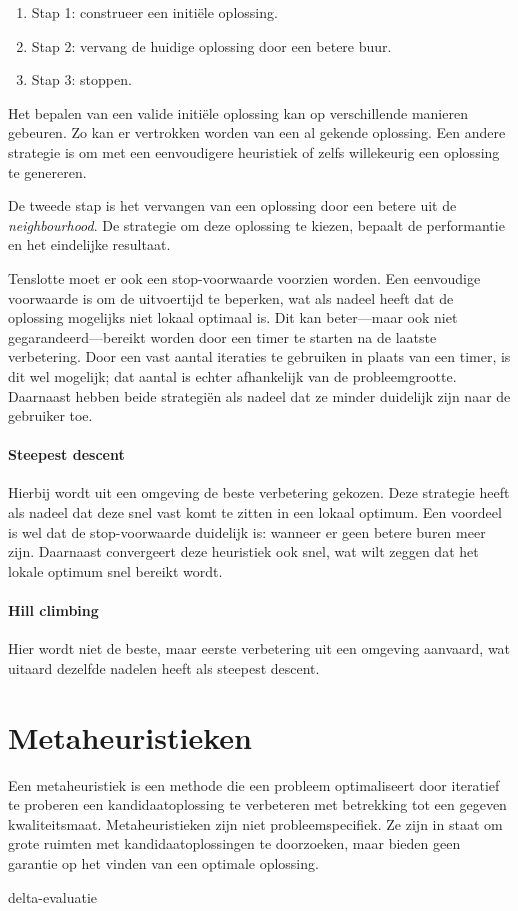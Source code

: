 %
\begin{enumerate}
    \item Stap 1: construeer een initi\"ele oplossing.
    \item Stap 2: vervang de huidige oplossing door een betere buur.
    \item Stap 3: stoppen.
\end{enumerate}
%

Het bepalen van een valide initi\"ele oplossing kan op verschillende manieren gebeuren. 
Zo kan er vertrokken worden van een al gekende oplossing. 
Een andere strategie is om met een eenvoudigere heuristiek of zelfs willekeurig een oplossing te genereren.

De tweede stap is het vervangen van een oplossing door een betere uit de \emph{neighbourhood}. 
De strategie om deze oplossing te kiezen, bepaalt de performantie en het eindelijke resultaat.

Tenslotte moet er ook een stop-voorwaarde voorzien worden. 
Een eenvoudige voorwaarde is om de uitvoertijd te beperken, wat als nadeel heeft dat de oplossing mogelijks niet lokaal optimaal is.
Dit kan beter---maar ook niet gegarandeerd---bereikt worden door een timer te starten na de laatste verbetering.
Door een vast aantal iteraties te gebruiken in plaats van een timer, is dit wel mogelijk; dat aantal is echter afhankelijk van de probleemgrootte. 
Daarnaast hebben beide strategi\"en als nadeel dat ze minder duidelijk zijn naar de gebruiker toe. 

\paragraph{Steepest descent}
Hierbij wordt uit een omgeving de beste verbetering gekozen. 
Deze strategie heeft als nadeel dat deze snel vast komt te zitten in een lokaal optimum. Een voordeel is wel dat de stop-voorwaarde duidelijk is: wanneer er geen betere buren meer zijn. Daarnaast convergeert deze heuristiek ook snel, wat wilt zeggen dat het lokale optimum snel bereikt wordt.

\paragraph{Hill climbing}
Hier wordt niet de beste, maar eerste verbetering uit een omgeving aanvaard, wat uitaard dezelfde nadelen heeft als steepest descent.

\section{Metaheuristieken}
Een metaheuristiek is een methode die een probleem optimaliseert door iteratief te proberen een kandidaatoplossing te verbeteren met betrekking tot een gegeven kwaliteitsmaat. 
Metaheuristieken zijn niet probleemspecifiek. 
Ze zijn in staat om grote ruimten met kandidaatoplossingen te doorzoeken, maar bieden geen garantie op het vinden van een optimale oplossing.

\TODO delta-evaluatie